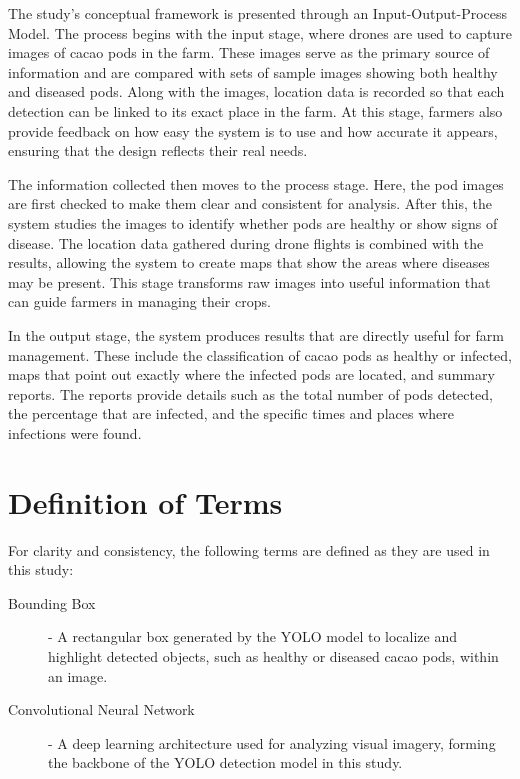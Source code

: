 {The study's conceptual framework is presented through an Input-Output-Process Model. The process begins with the input stage, where drones are used to capture images of cacao pods in the farm. These images serve as the primary source of information and are compared with sets of sample images showing both healthy and diseased pods. Along with the images, location data is recorded so that each detection can be linked to its exact place in the farm. At this stage, farmers also provide feedback on how easy the system is to use and how accurate it appears, ensuring that the design reflects their real needs.

The information collected then moves to the process stage. Here, the pod images are first checked to make them clear and consistent for analysis. After this, the system studies the images to identify whether pods are healthy or show signs of disease. The location data gathered during drone flights is combined with the results, allowing the system to create maps that show the areas where diseases may be present. This stage transforms raw images into useful information that can guide farmers in managing their crops.

In the output stage, the system produces results that are directly useful for farm management. These include the classification of cacao pods as healthy or infected, maps that point out exactly where the infected pods are located, and summary reports. The reports provide details such as the total number of pods detected, the percentage that are infected, and the specific times and places where infections were found.


\section{Definition of Terms}

For clarity and consistency, the following terms are defined as they are used in this study:

\begin{description}
	\item[Bounding Box] - A rectangular box generated by the YOLO model to localize and highlight detected objects, such as healthy or diseased cacao pods, within an image.
	
	\item[Convolutional Neural Network] - A deep learning architecture used for analyzing visual imagery, forming the backbone of the YOLO detection model in this study.
	

\end{description}}

